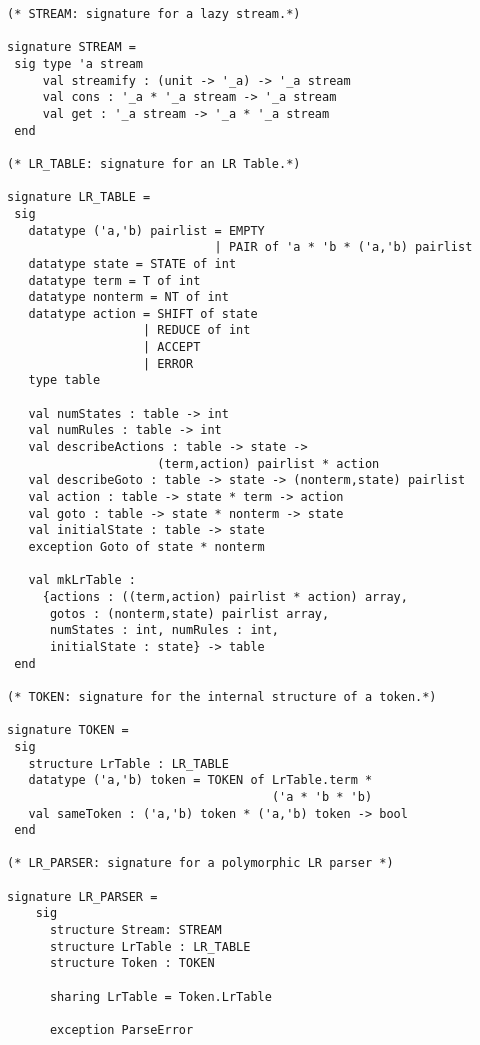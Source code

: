 \begin{tt}
\begin{verbatim}
(* STREAM: signature for a lazy stream.*)

signature STREAM =
 sig type 'a stream
     val streamify : (unit -> '_a) -> '_a stream
     val cons : '_a * '_a stream -> '_a stream
     val get : '_a stream -> '_a * '_a stream
 end

(* LR_TABLE: signature for an LR Table.*)

signature LR_TABLE =
 sig
   datatype ('a,'b) pairlist = EMPTY
                             | PAIR of 'a * 'b * ('a,'b) pairlist
   datatype state = STATE of int
   datatype term = T of int
   datatype nonterm = NT of int
   datatype action = SHIFT of state
                   | REDUCE of int
                   | ACCEPT
                   | ERROR
   type table
	
   val numStates : table -> int
   val numRules : table -> int
   val describeActions : table -> state ->
                     (term,action) pairlist * action
   val describeGoto : table -> state -> (nonterm,state) pairlist
   val action : table -> state * term -> action
   val goto : table -> state * nonterm -> state
   val initialState : table -> state
   exception Goto of state * nonterm

   val mkLrTable :
     {actions : ((term,action) pairlist * action) array,
      gotos : (nonterm,state) pairlist array,
      numStates : int, numRules : int,
      initialState : state} -> table
 end

(* TOKEN: signature for the internal structure of a token.*)

signature TOKEN =
 sig
   structure LrTable : LR_TABLE
   datatype ('a,'b) token = TOKEN of LrTable.term *
                                     ('a * 'b * 'b)
   val sameToken : ('a,'b) token * ('a,'b) token -> bool
 end

(* LR_PARSER: signature for a polymorphic LR parser *)

signature LR_PARSER =
    sig
      structure Stream: STREAM
      structure LrTable : LR_TABLE
      structure Token : TOKEN

      sharing LrTable = Token.LrTable

      exception ParseError


\end{verbatim}
\end{tt}
